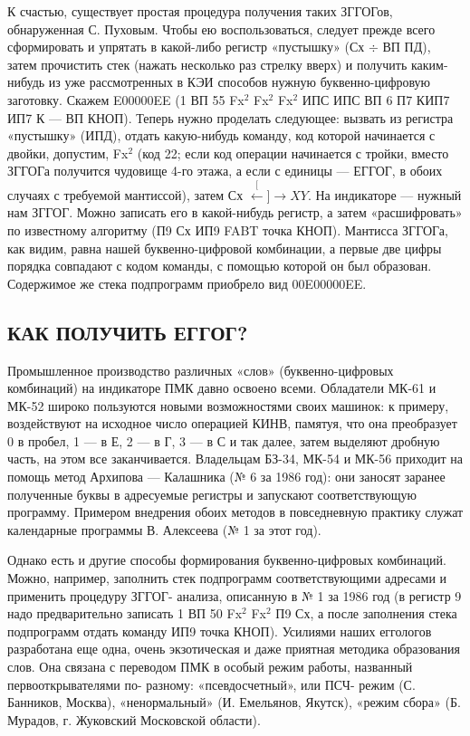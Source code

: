 \documentclass[11pt,a4paper,oneside]{article}
\def\XY{$\stackrel[\leftarrow]{\rightarrow}{XY}$}
\begin{document}
К счастью, существует простая процедура получения таких ЗГГОГов, обнаруженная С. Пуховым. Чтобы ею воспользоваться, следует прежде всего сформировать и упрятать в какой-либо регистр «пустышку» (Сх $\div$ ВП ПД), затем прочистить стек (нажать несколько раз стрелку вверх) и получить каким-нибудь из уже рассмотренных в КЭИ способов нужную буквенно-цифровую заготовку. Скажем E00000EE (1 ВП 55 Fx$^{2}$ Fx$^{2}$ Fx$^{2}$ ИПС ИПС ВП 6 П7 КИП7 ИП7 К — ВП КНОП). Теперь нужно проделать следующее: вызвать из регистра «пустышку» (ИПД), отдать какую-нибудь команду, код которой начинается с двойки, допустим, Fx$^{2}$ (код 22; если код операции начинается с тройки, вместо ЗГГОГа получится чудовище 4-го этажа, а если с единицы — ЕГГОГ, в обоих случаях с требуемой мантиссой), затем Сх \XY. На индикаторе — нужный нам ЗГГОГ. Можно записать его в какой-нибудь регистр, а затем «расшифровать» по известному алгоритму (П9 Сх ИП9 FABT точка КНОП). Мантисса ЗГГОГа, как видим, равна нашей буквенно-цифровой комбинации, а первые две цифры порядка совпадают с кодом команды, с помощью которой он был образован. Содержимое же стека подпрограмм приобрело вид 00E00000EE.

\subsection{КАК ПОЛУЧИТЬ ЕГГОГ?}
Промышленное производство различных «слов» (буквенно-цифровых комбинаций) на индикаторе ПМК давно освоено всеми. Обладатели МК-61 и МК-52 широко пользуются новыми возможностями своих машинок: к примеру, воздействуют на исходное число операцией КИНВ, памятуя, что она преобразует 0 в пробел, 1 — в Е, 2 — в Г, 3 — в С и так далее, затем выделяют дробную часть, на этом все заканчивается. Владельцам БЗ-34, МК-54 и МК-56 приходит на помощь метод Архипова — Калашника (№ 6 за 1986 год): они заносят заранее полученные буквы в адресуемые регистры и запускают соответствующую программу. Примером внедрения обоих методов в повседневную практику служат календарные программы В. Алексеева (№ 1 за этот год).

Однако есть и другие способы формирования буквенно-цифровых комбинаций. Можно, например, заполнить стек подпрограмм соответствующими адресами и применить процедуру ЗГГОГ- анализа, описанную в № 1 за 1986 год (в регистр 9 надо предварительно записать 1 ВП 50 Fx$^{2}$ Fx$^{2}$ П9 Сх, а после заполнения стека подпрограмм отдать команду ИП9 точка КНОП). Усилиями наших еггологов разработана еще одна, очень экзотическая и даже приятная методика образования слов. Она связана с переводом ПМК в особый режим работы, названный первооткрывателями по- разному: «псевдосчетный», или ПСЧ- режим (С. Банников, Москва), «ненормальный» (И. Емельянов, Якутск), «режим сбора» (Б. Мурадов, г. Жуковский Московской области).
\end{document}
